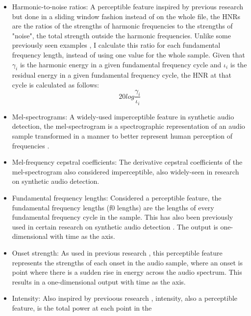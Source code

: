 \documentclass{article}
\begin{document}
			\begin{itemize}
				\item
					\sloppy
					Harmonic-to-noise ratios: A perceptible feature inspired by previous research
					\cite{chaiwongyen_contribution_2022,chaiwongyen_deepfake-speech_2023,
					li_comparative_2022} but done in a sliding window fashion instead of on the
					whole file, the HNRs are the ratios of the strengths of harmonic frequencies
					to the strengths of "noise", the total strength outside the harmonic
					frequencies. Unlike some previously seen examples
					\cite{chaiwongyen_contribution_2022, chaiwongyen_deepfake-speech_2023}, I
					calculate this ratio for each fundamental frequency length, instead of using
					one value for the whole sample. Given that \(\gamma_{i}\) is the harmonic
					energy in a given fundamental frequency cycle and \(\iota_{i}\) is the
					residual energy in a given fundamental frequency cycle, the HNR at that cycle
					is calculated as follows:
					\[ 20log\frac{\gamma_{i}}{\iota_{i}} \]
				\item
					Mel-spectrograms: A widely-used imperceptible feature in synthetic audio
					detection, the mel-spectrogram is a spectrographic representation of an audio
					sample transformed in a manner to better represent human perception of
					frequencies \cite{qais_deepfake_2022}.
				\item
					Mel-frequency cepstral coefficients: The derivative cepstral coefficients of
					the mel-spectrogram also considered imperceptible, also widely-seen in
					research on synthetic audio detection.
				\item
					Fundamental frequency lengths: Considered a perceptible feature, the
					fundamental frequency lengths (f0 lengths) are the lengths of every
					fundamental frequency cycle in the sample. This has also been previously used
					in certain research on synthetic audio detection \cite{xue_audio_2022}. The
					output is one-dimensional with time as the axis.
				\item
					Onset strength: As used in previous research \cite{li_comparative_2022}, this
					perceptible feature represents the strengths of each onset in the audio
					sample, where an onset is point where there is a sudden rise in energy across
					the audio spectrum. This results in a one-dimensional output with time as the
					axis.
				\item
					Intensity: Also inspired by previoous research \cite{li_comparative_2022},
					intensity, also a perceptible feature, is the total power at each point in the

\end{itemize}
\end{document}
